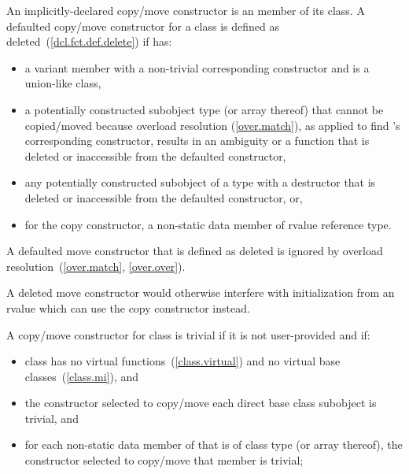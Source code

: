 \pnum
An implicitly-declared copy/move constructor is an
member of its class.
A defaulted copy/\brk{}move constructor for a class
   is defined as deleted~(\ref{dcl.fct.def.delete}) if  has:
\begin{itemize}
\item a variant member with a non-trivial corresponding constructor and
   is a union-like class,

\item a potentially constructed subobject type
   (or array thereof) that cannot be copied/moved because
  overload resolution (\ref{over.match}), as applied to find
  's 
  corresponding constructor, results in an ambiguity or 
  a function that is deleted or inaccessible from the
  defaulted constructor,

\item any potentially constructed subobject of a type
  with a destructor that is deleted or inaccessible from the defaulted
  constructor, or,

\item for the copy constructor, a non-static data member of rvalue reference type.
\end{itemize}

A defaulted move constructor that is defined as deleted is ignored by overload
resolution~(\ref{over.match}, \ref{over.over}).
\begin{note}
A deleted move constructor would otherwise interfere with initialization from
an rvalue which can use the copy constructor instead.
\end{note}

\pnum
{}%
%
A copy/move constructor for class
is
trivial
if it is not user-provided and if:

\begin{itemize}
\item
class
has no virtual functions~(\ref{class.virtual})
and no virtual base classes~(\ref{class.mi}), and

\item
the constructor selected to copy/move each direct base class subobject is trivial, and

\item
for each non-static data member of
that is of class type (or array thereof),
the constructor selected to copy/move that member is trivial;
\end{itemize}

